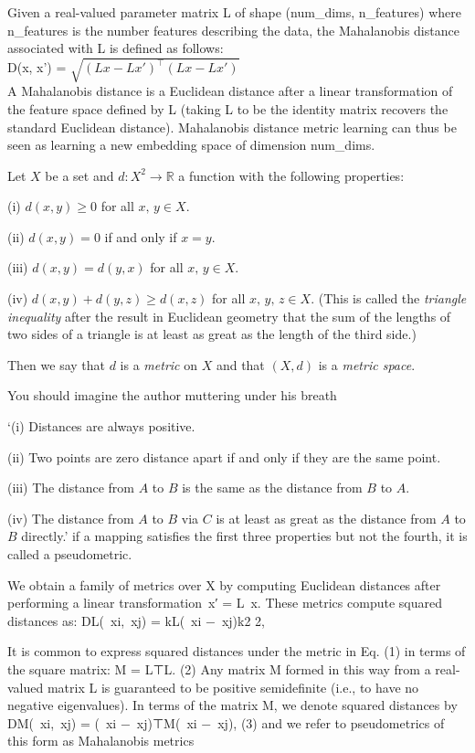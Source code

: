 \documentclass{article}
\begin{document}
Given a real-valued parameter matrix L of shape (num\_dims, n\_features) where n\_features is the number features describing the data, the Mahalanobis distance associated with L is defined as follows:\\
D(x, x') = $\sqrt{{(Lx-Lx')^\top(Lx-Lx')}}$ \\
A Mahalanobis distance is a Euclidean distance after a linear transformation of the feature space defined by L (taking L to be the identity matrix recovers the standard Euclidean distance). Mahalanobis distance metric learning can thus be seen as learning a new embedding space of dimension num\_dims.


\begin{definition}\label{D;metric} Let $X$ be a 
set and
$d:X^{2}\rightarrow{\mathbb R}$ a function with the
following properties:

(i) $d(x,y)\geq 0$ for all $x,\,y\in X$.

(ii) $d(x,y)=0$ if and only if $x=y$.

(iii) $d(x,y)=d(y,x)$ for all $x,\,y\in X$.

(iv) $d(x,y)+d(y,z)\geq d(x,z)$ for all $x,\,y,\,z\in X$.
(This is called the \emph{triangle inequality} after the
result in Euclidean geometry that the sum of the lengths
of two sides of a triangle is at least as great as the
length of the third side.)

Then we say that $d$ is a \emph{metric} on $X$ and that $(X,d)$
is a \emph{metric space}.
\end{definition}
You should imagine the author muttering under his breath

`(i) Distances are always positive.

(ii) Two points are zero distance apart if and only
if they are the same point.

(iii) The distance from $A$ to $B$ is the same
as the distance from $B$ to $A$.

(iv) The distance from $A$ to $B$ via $C$
is at least as great as the distance from $A$ to $B$
directly.'
if a mapping satisfies the first three properties but not the fourth, it is called a
pseudometric.

We obtain a family of metrics over X by computing Euclidean distances after performing a
linear transformation~x′ = L~x. These metrics compute squared distances as:
DL(~xi,~xj) = kL(~xi −~xj)k2 2,

It is common to express squared distances under the metric in Eq. (1) in terms of the square
matrix:
M = L⊤L. (2)
Any matrix M formed in this way from a real-valued matrix L is guaranteed to be positive semidefinite (i.e., to have no negative eigenvalues). In terms of the matrix M, we denote squared distances by
DM(~xi,~xj) = (~xi −~xj)⊤M(~xi −~xj), (3)
and we refer to pseudometrics of this form as Mahalanobis metrics
\end{document}
